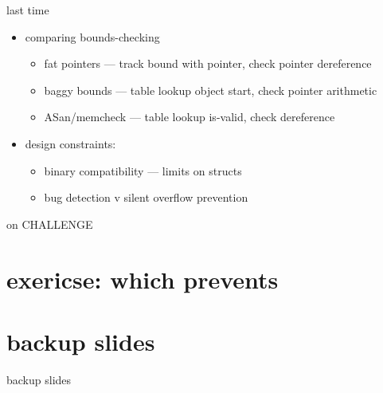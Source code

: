 \date{}
\title{}
\date{}
\usepackage[outputdir=latex.out]{minted}

\begin{frame}
    \titlepage
\end{frame}



\begin{frame}{last time}
    \begin{itemize}
    \item comparing bounds-checking
        \begin{itemize}
        \item fat pointers --- track bound with pointer, check pointer dereference
        \item baggy bounds --- table lookup object start, check pointer arithmetic
        \item ASan/memcheck --- table lookup is-valid, check dereference
        \end{itemize}
    \item design constraints:
        \begin{itemize}
        \item binary compatibility  --- limits on structs
        \item bug detection v silent overflow prevention
        \end{itemize}
    \end{itemize}
\end{frame}

\begin{frame}{on CHALLENGE}
\end{frame}

\section{exericse: which prevents}





\section{backup slides}
\begin{frame}{backup slides}
\end{frame}



